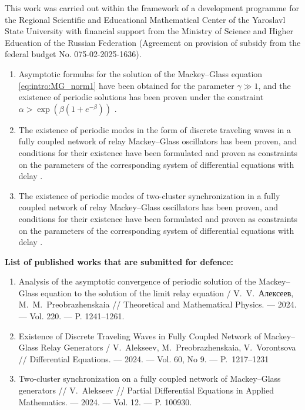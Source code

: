 This work was carried out within the framework of a development programme for the Regional Scientific and Educational Mathematical Center of the Yaroslavl State University with financial support from the Ministry of Science and Higher Education of the Russian Federation (Agreement on provision of subsidy from the federal budget No. 075-02-2025-1636).

\bigskip

{}
\begin{enumerate}[beginpenalty=10000] %
	\item Asymptotic formulas for the solution of the Mackey--Glass equation \eqref{eq:intro:MG_norm1} have been obtained for the parameter $\gamma \gg 1$, and the existence of periodic solutions has been proven under the constraint  $\alpha > \exp\left(\beta(1 + e^{-\beta})\right)$ \cite[Theorem 3.2]{wosbib1}.
	\item The existence of periodic modes in the form of discrete traveling waves in a fully coupled network of relay Mackey--Glass oscillators has been proven, and conditions for their existence have been formulated and proven as constraints on the parameters of the corresponding system of differential equations with delay \cite[Theorem 16]{wosbib2}.
	\item The existence of periodic modes of two-cluster synchronization in a fully coupled network of relay Mackey--Glass oscillators has been proven, and conditions for their existence have been formulated and proven as constraints on the parameters of the corresponding system of differential equations with delay \cite[Theorem 5.2]{scbib1}.
\end{enumerate}

\bigskip

\textbf{List of published works that are submitted for defence:}
\begin{enumerate}
	\item Analysis of the asymptotic convergence of periodic solution of the Mackey–Glass equation to the solution of the limit relay equation / V.~V.~Алексеев, M.~M.~Preobrazhenskaia // Theoretical and Mathematical Physics. --- 2024. --- Vol. 220. --- P. 1241--1261. \cite{wosbib1}
	\item Existence of Discrete Traveling Waves in Fully Coupled Network of Mackey--Glass Relay Generators / V.~Alekseev, M.~Preobrazhenskaia, V.~Vorontsova // Differential Equations. --- 2024. --- Vol. 60, No 9. --- P.~1217--1231 \cite{wosbib2}
	\item Two-cluster synchronization on a fully coupled network of Mackey--Glass generators // V.~Alekseev // Partial Differential Equations in Applied Mathematics. --- 2024. --- Vol. 12. --- P. 100930. \cite{scbib1}
\end{enumerate}


